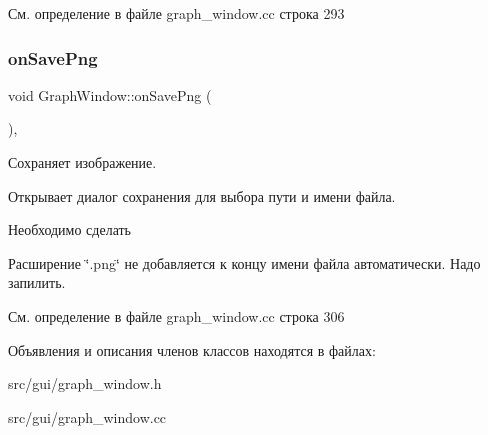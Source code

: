 См. определение в файле graph\+\_\+window.\+cc строка 293

\hypertarget{class_graph_window_a51f89adcbef5b90b9fdbb24bf7536fe5}{}\label{class_graph_window_a51f89adcbef5b90b9fdbb24bf7536fe5} 
\subsubsection{\texorpdfstring{on\+Save\+Png}{onSavePng}}
{\footnotesize\ttfamily void Graph\+Window\+::on\+Save\+Png (\begin{DoxyParamCaption}{ }\end{DoxyParamCaption})\hspace{0.3cm}{\ttfamily [private]}, {\ttfamily [slot]}}



Сохраняет изображение. 

Открывает диалог сохранения для выбора пути и имени файла.

\begin{DoxyRefDesc}{Необходимо сделать}
\item[\hyperlink{todo__todo000001}{Необходимо сделать}]Расширение \char`\"{}.\+png\char`\"{} не добавляется к концу имени файла автоматически. Надо запилить. \end{DoxyRefDesc}


См. определение в файле graph\+\_\+window.\+cc строка 306



Объявления и описания членов классов находятся в файлах\+:\begin{DoxyCompactItemize}
\item 
src/gui/graph\+\_\+window.\+h\item 
src/gui/graph\+\_\+window.\+cc\end{DoxyCompactItemize}

